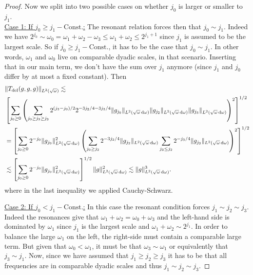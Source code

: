 \documentclass[reqno,11pt,letterpaper]{amsart}
\numberwithin{equation}{section}
\newcommand{\dd}{\, {\rm d}}
\begin{document}
\begin{proof}
        Now we split into two possible cases on whether $j_0$ is larger or smaller to $j_1$. \\

        \noindent
        \underline{Case 1: If $j_0 \geq j_1 - \text{Const.}$:} The resonant relation forces then that 
        $j_0 \sim j_1$. Indeed we have 
         $2^{j_0}\sim \omega_0  = \omega_1+\omega_2 - \omega_3 \leq \omega_1+\omega_2 \leq 2^{j_1+1}$ since $j_1$ is assumed to be the largest scale. So if 
$j_0 \geq j_1 - \text{Const.}$, it has to be the case that $j_0 \sim j_1$. In other words, $\omega_1$ and $\omega_0$ live on comparable dyadic scales, in that scenario.
Inserting that in our main term, we don't have the sum over $j_1$ anymore (since $j_1$ and $j_0$ differ by at most a fixed constant). Then 
\begin{equation}
    \begin{split}
      &\|T_{\text{del}}(g,g,g)\|_{L^2(\sqrt{\omega})} 
        \lesssim \\ & 
        \left[\sum_{j_0\geq 0}
                       \left( \sum_{j_0\geq j_2 \geq j_3} 
                       2^{(j_3-j_0)/2}
                       2^{-3j_2/4 - 3j_3/4}
\|g_{j_0}\|_{L^2(\sqrt{\omega}\dd\omega)}
 \| g_{j_2}\|_{L^2(\sqrt{\omega}\dd\omega)}
\| g_{j_3}\|_{L^2(\sqrt{\omega}\dd\omega)}\right)^2 \right]^{1/2}\\
& = \left[\sum_{j_0\geq 0}
2^{-j_0}
\|g_{j_0}\|_{L^2(\sqrt{\omega}\dd\omega)}^2 
              \left( \sum_{j_0\geq j_2}       
 2^{-3j_2/4} \| g_{j_2} \|_{L^2(\sqrt{\omega}\dd\omega)}
 \sum_{j_3 \leq j_2 } 2^{-j_3/4} 
\| g_{j_3}\|_{L^2(\sqrt{\omega}\dd\omega)}\right)^2 \right]^{1/2}
\\
    & \lesssim \left[\sum_{j_0\geq 0} 2^{-j_0}\|g_{j_0}\|_{L^2(\sqrt{\omega}\dd\omega)}^2
                \right]^{1/2} \|g\|_{L^2(\sqrt{\omega}\dd\omega)}^2 \lesssim \|g\|_{L^2(\sqrt{\omega}\dd\omega)}^3.
           \end{split}
        \end{equation}
where in the last inequality we applied Cauchy-Schwarz. 

        \noindent
        \underline{Case 2: If $j_0 < j_1 - \text{Const.}$:} In this case the resonant condition forces $j_1\sim j_2 \sim j_3$. Indeed the resonances give that $\omega_1+ \omega_2=\omega_0+\omega_3$ and the left-hand side is dominated by $\omega_1$ since $j_1$ is the largest scale and $\omega_1+\omega_2 \sim 2^{j_1}$. In order to balance the large $\omega_1$ on the left, the right-side must contain a comparable large term. But  given that $\omega_0< \omega_1$, it must be that $\omega_3 \sim \omega_1$ or equivalently that $j_3 \sim j_1$. Now, since we have assumed that $j_1\geq j_2\geq j_3$ it has to be that all  frequencies are in comparable dyadic scales and thus $j_1\sim j_2 \sim j_3$. 


\end{proof}
\end{document}

